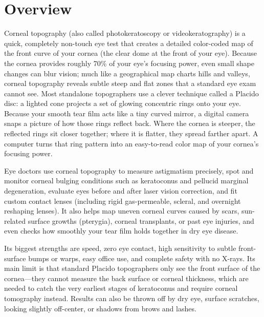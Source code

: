 \label{ch:infographic-corneal-topography}

\section{Overview}

Corneal topography (also called photokeratoscopy or videokeratography) is a quick, completely non-touch eye test that creates a detailed color-coded map of the front curve of your cornea (the clear dome at the front of your eye). Because the cornea provides roughly 70\% of your eye's focusing power, even small shape changes can blur vision; much like a geographical map charts hills and valleys, corneal topography reveals subtle steep and flat zones that a standard eye exam cannot see. Most standalone topographers use a clever technique called a Placido disc: a lighted cone projects a set of glowing concentric rings onto your eye. Because your smooth tear film acts like a tiny curved mirror, a digital camera snaps a picture of how those rings reflect back. Where the cornea is steeper, the reflected rings sit closer together; where it is flatter, they spread farther apart. A computer turns that ring pattern into an easy-to-read color map of your cornea's focusing power.

Eye doctors use corneal topography to measure astigmatism precisely, spot and monitor corneal bulging conditions such as keratoconus and pellucid marginal degeneration, evaluate eyes before and after laser vision correction, and fit custom contact lenses (including rigid gas-permeable, scleral, and overnight reshaping lenses). It also helps map uneven corneal curves caused by scars, sun-related surface growths (pterygia), corneal transplants, or past eye injuries, and even checks how smoothly your tear film holds together in dry eye disease.

Its biggest strengths are speed, zero eye contact, high sensitivity to subtle front-surface bumps or warps, easy office use, and complete safety with no X-rays. Its main limit is that standard Placido topographers only see the front surface of the cornea---they cannot measure the back surface or corneal thickness, which are needed to catch the very earliest stages of keratoconus and require corneal tomography instead. Results can also be thrown off by dry eye, surface scratches, looking slightly off-center, or shadows from brows and lashes.


